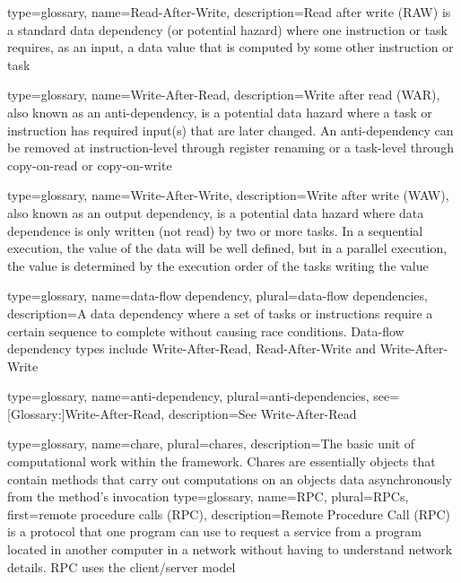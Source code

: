 {
  type=glossary,
  name={Read-After-Write},
  description={Read after write (\gls{RAW}) is a standard data dependency (or potential hazard) where one instruction or task requires, as an input, a data value that is computed by some other instruction or task}
}

{
  type=glossary,
  name={Write-After-Read},
  description={Write after read (\gls{WAR}), also known as an anti-dependency, is a potential data hazard where a task or instruction has required input(s) that are later changed. An anti-dependency can be removed at instruction-level through register renaming or a task-level through copy-on-read or copy-on-write}
}

{
  type=glossary,
  name={Write-After-Write},
  description={Write after write (\gls{WAW}), also known as an output
  dependency, is a potential data hazard where data dependence is only
  written (not read) by two or more tasks. In a sequential execution, the value
  of the data will be well defined, but in a parallel execution, the
  value is determined by the execution order of the tasks writing the
  value}
}

{
  type=glossary,
  name={data-flow dependency},
  plural={data-flow dependencies},
  description={A data dependency where a set of tasks or instructions require a certain sequence to complete without causing race conditions. Data-flow dependency types include \gls{Write-After-Read}, \gls{Read-After-Write} and \gls{Write-After-Write}}
}

{
  type=glossary,
  name={anti-dependency},
  plural={anti-dependencies},
  see={[Glossary:]{Write-After-Read}},
  description={See \gls{Write-After-Read}}
}

{
  type=glossary,
  name={chare},
  plural={chares},
  description={The basic unit of computational work within the \Charm{} framework. Chares are essentially \protect\CC{} objects that contain methods that carry out computations on an objects data asynchronously from the method's invocation}
}
{
  type=glossary,
  name={RPC},
  plural={RPCs},
  first={remote procedure calls (RPC)},
  description={Remote Procedure Call (RPC) is a protocol that one
  program can use to request a service from a program located in
  another computer in a network without having to understand network
  details. RPC uses the client/server model}
}

